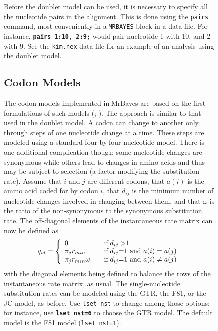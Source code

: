 \documentclass[12pt]{book}
\newcommand{\ttt}[1]{\texttt{#1}}
\newcommand{\tb}[1]{\ttt{\textbf{#1}}}
\begin{document}
\begin{figure}[h]
Before the doublet model can be used, it is necessary to specify all the nucleotide pairs in the
alignment. This is done using the \ttt{pairs} command, most conveniently in a \ttt{MRBAYES} block
in a data file. For instance, \tb{pairs 1:10, 2:9;} would pair nucleotide 1 with 10, and 2 with 9.
See the \ttt{kim.nex} data file for an example of an analysis using the doublet model.

\subsection{Codon Models}

The codon models implemented in MrBayes are based on the first formulations of such models
(\citet{goldman94}; \citet{muse94}). The approach is similar to that used in the doublet model. A
codon can change to another only through steps of one nucleotide change at a time. These steps are
modeled using a standard four by four nucleotide model. There is one additional complication
though: some nucleotide changes are synonymous while others lead to changes in amino acids and thus
may be subject to selection (a factor modifying the substitution rate). Assume that $i$ and $j$ are
different codons, that $a(i)$ is the amino acid coded for by codon $i$, that $d_{ij}$ is the
minimum number of nucleotide changes involved in changing between them, and that $\omega$ is the
ratio of the non-synonymous to the synonymous substitution rate. The off-diagonal elements of the
instantaneous rate matrix can now be defined as
\[
q_{ij} = \left\{
\begin{array}{l l}
  0 & \quad \text{if $d_{ij}>$1 } \\
 \pi_j r_{min} & \quad \text{if $d_{ij}$=1 and $a(i)=a(j)$}\\
 \pi_j r_{min} \omega & \quad \text{if $d_{ij}$=1 and $a(i)\neq a(j)$}\\
\end{array} \right.
\]
with the diagonal elements being defined to balance the rows of the instantaneous rate matrix, as
usual. The single-nucleotide substitution rates can be modeled using the GTR, the F81, or the JC
model, as before. Use \ttt{lset nst} to change among those options; for instance, use \tb{lset
nst=6} to choose the GTR model. The default model is the F81 model (\ttt{lset nst=1}).


\end{figure}
\end{document}
